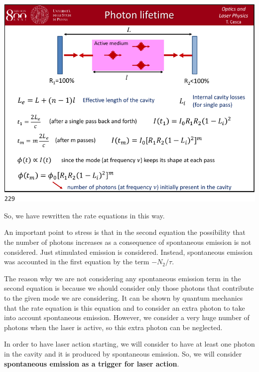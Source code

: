 \documentclass[../main/main.tex]{subfiles}
\begin{document}
\begin{minipage}[]{0.5\linewidth}
\centering
\includegraphics[page=12,width=1\textwidth]{../lessons/pdf_file/12_lecture.pdf}
\end{minipage}
\hspace{0.3cm}\vspace{0.3cm}
\begin{minipage}[c]{0.47\linewidth}

So, we have rewritten the rate equations in this way.

An important point to stress is that in the second equation the possibility that the number of photons increases as a consequence of spontaneous emission is not considered. Just stimulated emission is considered.
Instead, spontaneous emission was accounted in the first equation by the term \( -N_2/ \tau  \).

The reason why we are not considering any spontaneous emission term in the second equation is because we should consider only those photons that contribute to the given mode we are considering. It can be shown by quantum mechanics that the rate equation is this equation and to consider an extra photon to take into account spontaneous emission.
However, we consider a very huge number of photons when the laser is active, so this extra photon can be neglected.

\end{minipage}

In order to have laser action starting, we will consider to have at least one photon in the cavity and it is produced by spontaneous emission. So, we will consider \textbf{spontaneous emission as a trigger for laser action}.
\end{document}
